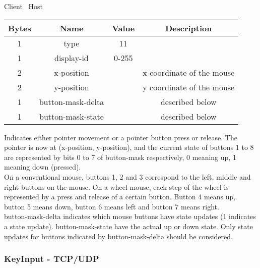 \begin{center}
    Client \textrightarrow\ Host\\
    \begin{tabular}{|c|c|c|c|}
        \hline
        \textbf{Bytes} & \textbf{Name}     & \textbf{Value} & \textbf{Description}      \\
        \hline
        1              & type              & 11              &                           \\
        \hline
        1              & display-id        & 0-255          &                           \\
        \hline
        2              & x-position        &                & x coordinate of the mouse \\
        \hline
        2              & y-position        &                & y coordinate of the mouse \\
        \hline
        1              & button-mask-delta &                & described below           \\
        \hline
        1              & button-mask-state &                & described below           \\
        \hline
    \end{tabular}
\end{center}

Indicates either pointer movement or a pointer button press or release. The pointer is now at (x-position,
y-position), and the current state of buttons 1 to 8 are represented by bits 0 to 7 of button-mask respectively,
0 meaning up, 1 meaning down (pressed).\\

On a conventional mouse, buttons 1, 2 and 3 correspond to the left, middle and right buttons on the mouse. On a
wheel mouse, each step of the wheel is represented by a press and release of a certain button. Button 4 means up,
button 5 means down, button 6 means left and button 7 means right.\\

button-mask-delta indicates which mouse buttons have state updates (1 indicates a state update). button-mask-state have the actual up or down state. Only state updates for buttons indicated by button-mask-delta should be considered.

\subsubsection{KeyInput - TCP/UDP}

